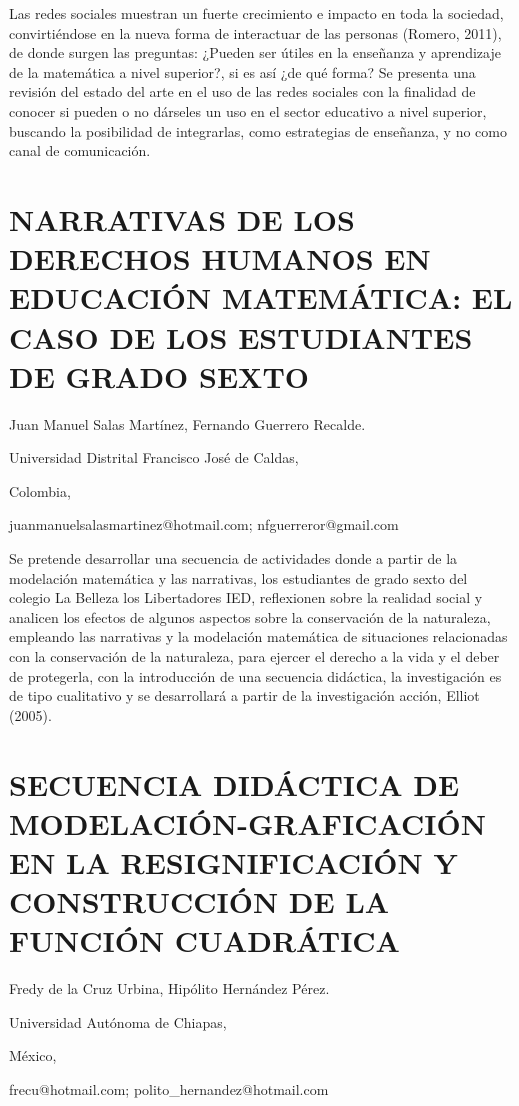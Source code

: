 Las redes sociales muestran un fuerte crecimiento e impacto en toda
la sociedad, convirtiéndose en la nueva forma de interactuar de las
personas (Romero, 2011), de donde surgen las preguntas: ¿Pueden ser
útiles en la enseñanza y aprendizaje de la matemática a nivel superior?,
si es así ¿de qué forma? Se presenta una revisión del estado del arte
en el uso de las redes sociales con la finalidad de conocer si pueden
o no dárseles un uso en el sector educativo a nivel superior, buscando
la posibilidad de integrarlas, como estrategias de enseñanza, y no
como canal de comunicación.


\section{NARRATIVAS DE LOS DERECHOS HUMANOS EN EDUCACIÓN MATEMÁTICA: EL CASO
DE LOS ESTUDIANTES DE GRADO SEXTO }

\begin{datos}

Juan Manuel Salas Martínez, Fernando Guerrero Recalde.

Universidad Distrital Francisco José de Caldas,

Colombia,

juanmanuelsalasmartinez@hotmail.com; nfguerreror@gmail.com 

\end{datos}

Se pretende desarrollar una secuencia de actividades donde a partir
de la modelación matemática y las narrativas, los estudiantes de grado
sexto del colegio La Belleza los Libertadores IED, reflexionen sobre
la realidad social y analicen los efectos de algunos aspectos sobre
la conservación de la naturaleza, empleando las narrativas y la modelación
matemática de situaciones relacionadas con la conservación de la naturaleza,
para ejercer el derecho a la vida y el deber de protegerla, con la
introducción de una secuencia didáctica, la investigación es de tipo
cualitativo y se desarrollará a partir de la investigación acción,
Elliot (2005).


\section{SECUENCIA DIDÁCTICA DE MODELACIÓN-GRAFICACIÓN EN LA RESIGNIFICACIÓN
Y CONSTRUCCIÓN DE LA FUNCIÓN CUADRÁTICA}

\begin{datos}

Fredy de la Cruz Urbina, Hipólito Hernández Pérez.

Universidad Autónoma de Chiapas,

México,

frecu@hotmail.com; polito\_hernandez@hotmail.com 

\end{datos}

